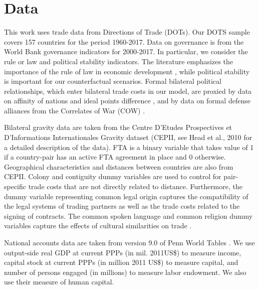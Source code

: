\section{Data}
This work uses trade data from Directions of Trade (DOTs). Our DOTS sample covers 157 countries for the period 1960-2017. Data on governance is from the World Bank governance indicators for 2000-2017. In particular, we consider the rule or law and political stability indicators. The literature emphasizes the importance of the rule of law in economic development \citep{Acemoglu2001, Acemoglu2002}, while political stability is important for our counterfactual scenarios. Formal bilateral political relationships, which enter bilateral trade costs in our model, are proxied by data on affinity of nations and ideal points difference \citep{Bailey2017EstimatingData}, and by data on formal defense alliances from the Correlates of War (COW) \citep{gibler2009cow}.


Bilateral gravity data are taken from the Centre D'Etudes Prospectives et D'Informations Internationales Gravity dataset (CEPII, see Head et al., 2010 for a detailed description of the data). FTA is a binary variable that takes value of 1 if a country-pair has an active FTA agreement in place and 0 otherwise.  Geographical characteristics and distances between countries are also from CEPII. Colony and contiguity dummy variables are used to control for pair-specific trade costs that are not directly related to distance. Furthermore, the dummy variable representing common legal origin captures the compatibility of the legal systems of trading partners as well as the trade costs related to the signing of contracts. The common spoken language and common religion dummy variables capture the effects of cultural similarities on trade \citep{Melitz2014}.
 
National accounts data are taken from version 9.0 of Penn World Tables \citep{Feenstra2014}. We use output-side real GDP at current PPPs (in mil. 2011US\$) to measure income, capital stock at current PPPs (in million 2011 US\$) to measure capital, and number of persons engaged (in millions) to measure labor endowment. We also use their measure of human capital.

